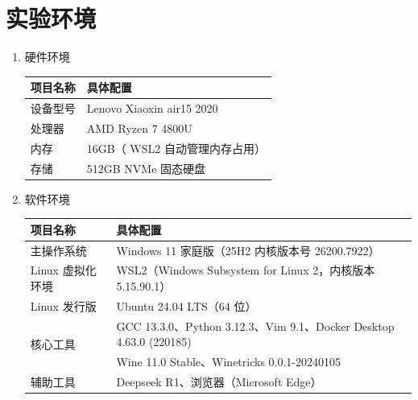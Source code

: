\documentclass[12pt]{ctexart}
\begin{document}
	\section{实验环境}
	\begin{enumerate}
		\item[\textbf{1.}]硬件环境
		\begin{center}
			\begin{tabular}{ll}
				\toprule[1pt]
				项目名称 &具体配置\\
				\toprule[1pt]
				设备型号&Lenovo Xiaoxin air15 2020\\
				\midrule
				处理器&AMD Ryzen 7 4800U\\
				\midrule
				内存&16GB（ WSL2 自动管理内存占用）\\
				\midrule
				存储&512GB NVMe 固态硬盘\\
			\end{tabular}
		\end{center}
		\item[\textbf{2.}]软件环境
		\begin{center}
			\begin{tabular}{ll}
				\toprule[1pt]
				项目名称 & 具体配置\\
				\toprule[1pt]
				主操作系统 &Windows 11 家庭版（25H2 内核版本号 26200.7922）\\
				\midrule
				Linux 虚拟化环境 &WSL2（Windows Subsystem for Linux 2，内核版本 5.15.90.1）\\
				\midrule
				Linux 发行版 &Ubuntu 24.04 LTS（64 位）\\
				\midrule
				\multirow{2}{*}{核心工具} &GCC 13.3.0、Python 3.12.3、Vim 9.1、Docker Desktop 4.63.0 (220185)\\
				        &Wine 11.0 Stable、Winetricks 0.0.1-20240105\\
				        \midrule
				辅助工具 &Deepseek R1、浏览器（Microsoft Edge）\\
			\end{tabular}
		\end{center}
	\end{enumerate}
\end{document}
